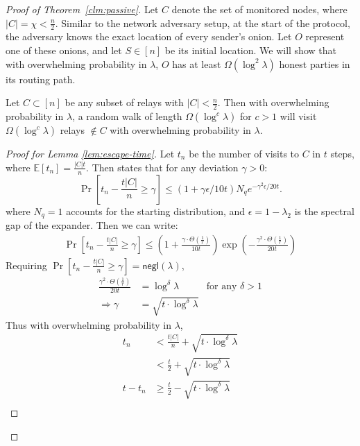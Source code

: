 \begin{proof} [Proof of Theorem~\ref{clm:passive}]

Let $C$ denote the set of monitored nodes, where $|C| = \chi < \frac{n}{2}$. Similar to the network adversary setup, at the start of the protocol, the adversary knows the exact location of every sender's onion. Let $O$ represent one of these onions, and let $S \in [n]$ be its initial location. We will show that with overwhelming probability in $\lambda$, $O$ has at least $\Omega(\log^2 \lambda)$ honest parties in its routing path. 


\begin{lemma}\label{lem:escape-time}
Let $C \subset [n]$ be any subset of relays with $|C| < \frac{n}{2}$. Then with overwhelming probability in $\lambda$, a random walk of length $\Omega(\log^c \lambda)$ for $c > 1$ will visit $\Omega(\log^c \lambda)$ relays $\not\in C$ with overwhelming probability in $\lambda$.
\end{lemma}
\begin{proof}[Proof for Lemma \ref{lem:escape-time}]
Let $t_n$ be the number of visits to $C$ in $t$ steps, where $\mathbb{E}[t_n] = \frac{|C|t}{n}$. Then \cite[Theorem 2.1]{gillman1998chernoff} states that for any deviation $\gamma > 0$:
$$
\Pr[t_n - \frac{t|C|}{n} \geq \gamma] \leq (1 + \gamma \epsilon / 10t) N_q e^{-\gamma^2 \epsilon / 20t}.
$$
where $N_q = 1$ accounts for the starting distribution, and $\epsilon = 1 - \lambda_2$ is the spectral gap of the expander. Then we can write:
\begin{align*}
    \Pr[t_n - \frac{t|C|}{n} \geq \gamma] \leq (1 + \frac{\gamma \cdot \Theta\left(\frac{1}{r}\right)}{10t}) \exp(-\frac{\gamma^2 \cdot \Theta\left(\frac{1}{r}\right)}{20t})
\end{align*}
Requiring $\Pr[t_n - \frac{t|C|}{n} \geq \gamma] = \mathsf{negl}(\lambda)$,
\begin{align*}
    \frac{\gamma^2 \cdot \Theta\left(\frac{1}{r}\right)}{20t} &= \log^\delta \lambda &\text{for any $\delta > 1$}\\
    \Rightarrow \gamma &= \sqrt{t \cdot \log^\delta \lambda}
\end{align*}
Thus with overwhelming probability in $\lambda$, 
\begin{align*}
    t_n &< \frac{t|C|}{n} + \sqrt{t \cdot \log^\delta \lambda}\\
    &< \frac{t}{2} + \sqrt{t \cdot \log^\delta \lambda}\\
    t - t_n &\geq \frac{t}{2} - \sqrt{t \cdot \log^\delta \lambda}\\

\end{align*}
\end{proof}
\end{proof}
